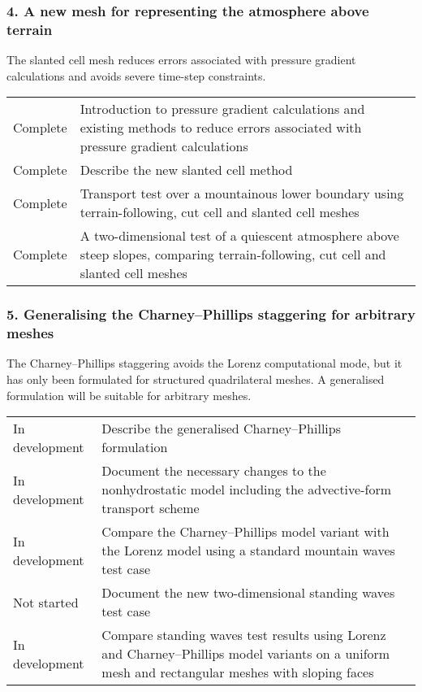 \documentclass[a4paper,11pt]{article}
\begin{document}
\subsubsection*{4. A new mesh for representing the atmosphere above terrain}
\noindent The slanted cell mesh reduces errors associated with pressure gradient calculations and avoids severe time-step constraints.
\vspace*{0.5em}

\begin{tabularx}{\linewidth}{>{\hsize=0.9in}X X}
\rowcolor{done} Complete & Introduction to pressure gradient calculations and existing methods to reduce errors associated with pressure gradient calculations \\
\rowcolor{done} Complete & Describe the new slanted cell method \\
\rowcolor{done} Complete & Transport test over a mountainous lower boundary using terrain-following, cut cell and slanted cell meshes \\
\rowcolor{done} Complete & A two-dimensional test of a quiescent atmosphere above steep slopes, comparing terrain-following, cut cell and slanted cell meshes \\
\end{tabularx}

\subsubsection*{5. Generalising the Charney--Phillips staggering for arbitrary meshes}
\noindent The Charney--Phillips staggering avoids the Lorenz computational mode, but it has only been formulated for structured quadrilateral meshes.  A generalised formulation will be suitable for arbitrary meshes.
\vspace*{0.5em}

\begin{tabularx}{\linewidth}{>{\hsize=1.3in}X X}
	In development & Describe the generalised Charney--Phillips formulation \\
	In development & Document the necessary changes to the nonhydrostatic model including the advective-form transport scheme \\
	In development & Compare the Charney--Phillips model variant with the Lorenz model using a standard mountain waves test case \citep{schaer2002} \\
	Not started & Document the new two-dimensional standing waves test case \\
	In development & Compare standing waves test results using Lorenz and Charney--Phillips model variants on a uniform mesh and rectangular meshes with sloping faces
\end{tabularx}
\end{document}
